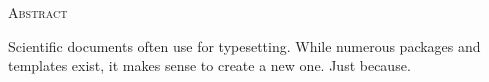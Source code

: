 \begin{center}
  \textsc{Abstract}
\end{center}
%
\noindent
%
Scientific documents often use for typesetting.
While numerous packages and templates exist, it makes sense to create a new one.
Just because.
